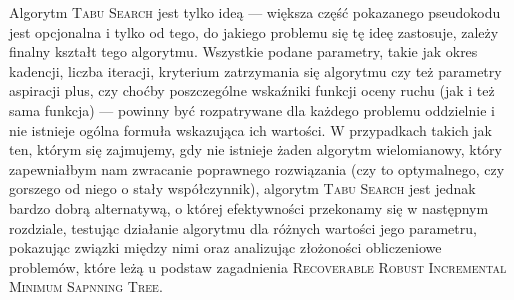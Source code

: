 Algorytm \textsc{Tabu Search} jest tylko ideą --- większa część pokazanego pseudokodu jest opcjonalna i tylko od tego, do jakiego problemu się tę ideę zastosuje, zależy finalny kształt tego algorytmu. Wszystkie podane parametry, takie jak okres kadencji, liczba iteracji, kryterium zatrzymania się algorytmu czy też parametry aspiracji plus, czy choćby poszczególne wskaźniki funkcji oceny ruchu (jak i też sama funkcja) --- powinny być rozpatrywane dla każdego problemu oddzielnie i nie istnieje ogólna formuła wskazująca ich wartości. W przypadkach takich jak ten, którym się zajmujemy, gdy nie istnieje żaden algorytm wielomianowy, który zapewniałbym nam zwracanie poprawnego rozwiązania (czy to optymalnego, czy gorszego od niego o stały współczynnik), algorytm \textsc{Tabu Search} jest jednak bardzo dobrą alternatywą, o której efektywności przekonamy się w następnym rozdziale, testując działanie algorytmu dla różnych wartości jego parametru, pokazując związki między nimi oraz analizując złożoności obliczeniowe problemów, które leżą u podstaw zagadnienia \textsc{Recoverable Robust Incremental Minimum Sapnning Tree}.